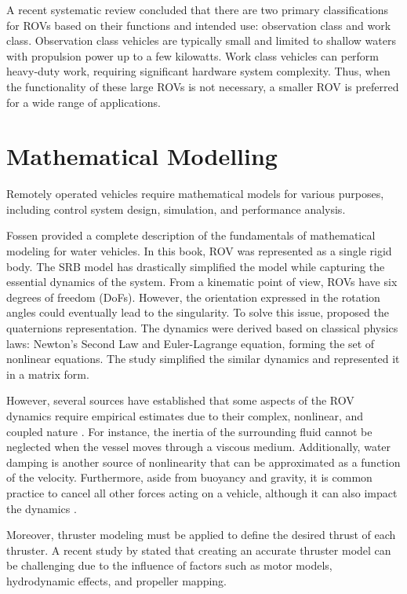 A recent systematic review \cite{inspection_review} concluded that there are two primary classifications for ROVs based 
on their functions and intended use: observation class and work class. Observation class vehicles 
are typically small and limited to shallow waters with propulsion power up to a few kilowatts. Work 
class vehicles can perform heavy-duty work, requiring significant hardware 
system complexity. Thus, when the functionality of these large 
ROVs is not necessary, a smaller ROV is preferred for a wide range of applications.

\section{Mathematical Modelling}

Remotely operated vehicles require mathematical models for various purposes, including control 
system design, simulation, and performance analysis.

Fossen \cite{fossen:guidance} provided a complete description of the fundamentals of mathematical modeling for water 
vehicles. In this book, ROV was represented as a 
single rigid body. The SRB model has drastically simplified the model while capturing the essential 
dynamics of the system. From a kinematic 
point of view, ROVs have six degrees of freedom (DoFs). However, the orientation expressed 
in the rotation angles could eventually lead to the singularity. To solve this issue, 
\cite{quat_smc} proposed the quaternions representation. The dynamics were derived based on classical 
physics laws: Newton’s Second Law and Euler-Lagrange equation, forming the set of nonlinear equations.
The study \cite{identification} simplified the similar dynamics and represented it in a matrix form.

However, several sources have established that some aspects of the ROV dynamics require empirical 
estimates due to their complex, nonlinear, and coupled nature \cite{fossen:guidance, bluerov}. For instance, the inertia 
of the surrounding fluid cannot be neglected when the vessel moves through a viscous medium. Additionally, water damping is another source of nonlinearity that 
can be approximated as a function of the velocity. Furthermore, aside from buoyancy and 
gravity, it is common practice to cancel all other forces acting on a vehicle, although it can also impact the dynamics \cite{bluerov}.

Moreover, thruster modeling must be applied to define the desired thrust of each thruster. A recent 
study by \cite{bluerov} stated that creating an accurate thruster model can be challenging due to the 
influence of factors such as motor models, hydrodynamic effects, and propeller mapping.


